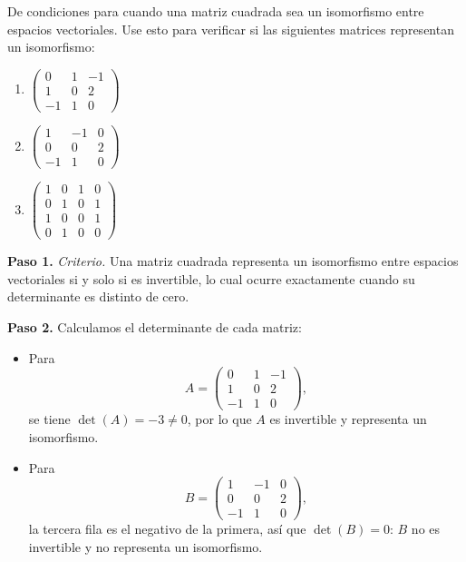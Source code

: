 \begin{prob}
De condiciones para cuando una matriz cuadrada sea un isomorfismo entre espacios vectoriales. Use esto para verificar si las siguientes matrices representan un isomorfismo:
\begin{enumerate}[$a)$]
\item $\begin{pmatrix} 0 & 1 & -1 \\ 1 & 0 & 2 \\ -1 & 1 & 0 \end{pmatrix}$
\item $\begin{pmatrix} 1 & -1 & 0 \\ 0 & 0 & 2 \\ -1 & 1 & 0 \end{pmatrix}$
\item $\begin{pmatrix} 1 & 0 & 1 & 0 \\ 0 & 1 & 0 & 1 \\ 1 & 0 & 0 & 1 \\ 0 & 1 & 0 & 0 \end{pmatrix}$
\end{enumerate}
\begin{myproof}
\textbf{Paso 1.} \emph{Criterio.} Una matriz cuadrada representa un isomorfismo entre espacios vectoriales si y solo si es invertible, lo cual ocurre exactamente cuando su determinante es distinto de cero.

\textbf{Paso 2.} Calculamos el determinante de cada matriz:

\begin{itemize}
    \item[a)] Para
    \[
    A = \begin{pmatrix} 0 & 1 & -1 \\ 1 & 0 & 2 \\ -1 & 1 & 0 \end{pmatrix},
    \]
    se tiene $\det(A) = -3 \neq 0$, por lo que $A$ es invertible y representa un isomorfismo.

    \item[b)] Para
    \[
    B = \begin{pmatrix} 1 & -1 & 0 \\ 0 & 0 & 2 \\ -1 & 1 & 0 \end{pmatrix},
    \]
    la tercera fila es el negativo de la primera, así que $\det(B) = 0$: $B$ no es invertible y no representa un isomorfismo.


\end{itemize}
\end{myproof}
\end{prob}
